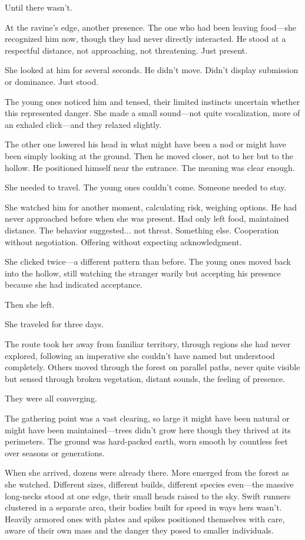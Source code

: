 Until there wasn't.

At the ravine's edge, another presence. The one who had been leaving food—she recognized him now, though they had never directly interacted. He stood at a respectful distance, not approaching, not threatening. Just present.

She looked at him for several seconds. He didn't move. Didn't display submission or dominance. Just stood.

The young ones noticed him and tensed, their limited instincts uncertain whether this represented danger. She made a small sound—not quite vocalization, more of an exhaled click—and they relaxed slightly.

The other one lowered his head in what might have been a nod or might have been simply looking at the ground. Then he moved closer, not to her but to the hollow. He positioned himself near the entrance. The meaning was clear enough.

She needed to travel. The young ones couldn't come. Someone needed to stay.

She watched him for another moment, calculating risk, weighing options. He had never approached before when she was present. Had only left food, maintained distance. The behavior suggested... not threat. Something else. Cooperation without negotiation. Offering without expecting acknowledgment.

She clicked twice—a different pattern than before. The young ones moved back into the hollow, still watching the stranger warily but accepting his presence because she had indicated acceptance.

Then she left.

\scenebreak

She traveled for three days.

The route took her away from familiar territory, through regions she had never explored, following an imperative she couldn't have named but understood completely. Others moved through the forest on parallel paths, never quite visible but sensed through broken vegetation, distant sounds, the feeling of presence.

They were all converging.

The gathering point was a vast clearing, so large it might have been natural or might have been maintained—trees didn't grow here though they thrived at its perimeters. The ground was hard-packed earth, worn smooth by countless feet over seasons or generations.

When she arrived, dozens were already there. More emerged from the forest as she watched. Different sizes, different builds, different species even—the massive long-necks stood at one edge, their small heads raised to the sky. Swift runners clustered in a separate area, their bodies built for speed in ways hers wasn't. Heavily armored ones with plates and spikes positioned themselves with care, aware of their own mass and the danger they posed to smaller individuals.

